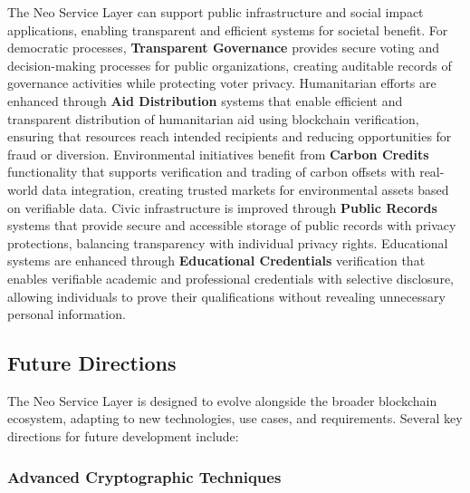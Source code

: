 \documentclass{article}
\begin{document}
The Neo Service Layer can support public infrastructure and social impact applications, enabling transparent and efficient systems for societal benefit. For democratic processes, \textbf{Transparent Governance} provides secure voting and decision-making processes for public organizations, creating auditable records of governance activities while protecting voter privacy. Humanitarian efforts are enhanced through \textbf{Aid Distribution} systems that enable efficient and transparent distribution of humanitarian aid using blockchain verification, ensuring that resources reach intended recipients and reducing opportunities for fraud or diversion. Environmental initiatives benefit from \textbf{Carbon Credits} functionality that supports verification and trading of carbon offsets with real-world data integration, creating trusted markets for environmental assets based on verifiable data. Civic infrastructure is improved through \textbf{Public Records} systems that provide secure and accessible storage of public records with privacy protections, balancing transparency with individual privacy rights. Educational systems are enhanced through \textbf{Educational Credentials} verification that enables verifiable academic and professional credentials with selective disclosure, allowing individuals to prove their qualifications without revealing unnecessary personal information.

\subsection{Future Directions}
\label{subsec:nsl-future}

The Neo Service Layer is designed to evolve alongside the broader blockchain ecosystem, adapting to new technologies, use cases, and requirements. Several key directions for future development include:

\subsubsection{Advanced Cryptographic Techniques}
\label{subsubsec:advanced-crypto}
\end{document}
